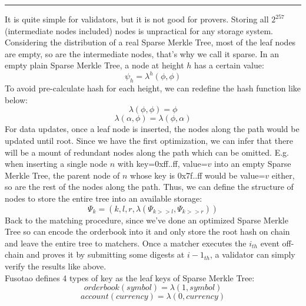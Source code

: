 \documentclass[a4paper,12pt]{article}
\begin{document}
\noindent\rule{\textwidth}{0.5pt}
It is quite simple for validators, but it is not good for provers. Storing all \(2^{257}\) (intermediate nodes included) nodes is unpractical for any storage system. Considering the distribution of a real Sparse Merkle Tree, most of the leaf nodes are empty, so are the intermediate nodes, that’s why we call it sparse. In an empty plain Sparse Merkle Tree, a node at height \(h\) has a certain value:\\
\begin{equation*}
    \psi_{h} = \lambda^{h}(\phi, \phi)
\end{equation*}
To avoid pre-calculate hash for each height, we can redefine the hash function like below:\\
\begin{equation*}
    \lambda(\phi, \phi) = \phi
\end{equation*}
\begin{equation*}
    \lambda(\alpha, \phi) = \lambda(\phi, \alpha)
\end{equation*}
For data updates, once a leaf node is inserted, the nodes along the path would be updated until root. Since we have the first optimization, we can infer that there will be a mount of redundant nodes along the path which can be omitted. E.g. when inserting a single node \(n\) with key=0xff..ff, value=\(v\) into an empty Sparse Merkle Tree, the parent node of \(n\) whose key is 0x7f..ff would be value=\(v\) either, so are the rest of the nodes along the path. Thus, we can define the structure of nodes to store the entire tree into an available storage:\\
\begin{equation*}
    \Psi_{k} = (k, l, r, \lambda(\Psi_{k>>l}, \Psi_{k>>r}))
\end{equation*}
Back to the matching procedure, since we've done an optimized Sparse Merkle Tree so can encode the orderbook into it and only store the root hash on chain and leave the entire tree to matchers. Once a matcher executes the \(i_{th}\) event off-chain and proves it by submitting some digests at \(i-1_{th}\), a validator can simply verify the results like above.\\
Fusotao defines 4 types of key as the leaf keys of Sparse Merkle Tree:\\
\begin{equation*}
    orderbook(symbol) = \lambda(1, symbol)
\end{equation*}
\begin{equation*}
    account(currency) = \lambda(0, currency)
\end{equation*}
\end{document}
